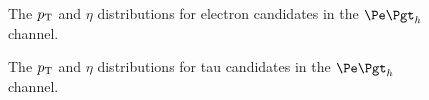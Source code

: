 \begin{figure}[htb]
\begin{center}

\end{center}
\caption{
The $p_{\mathrm{T}}$ and $\eta$ distributions for electron candidates in the $\etau$
channel.
}
\label{fig:etauelectrons}
\end{figure}


\begin{figure}[htb]
\begin{center}

\end{center}
\caption{
The $p_{\mathrm{T}}$ and $\eta$ distributions for tau candidates in the $\etau$
channel.
}
\label{fig:etautaus}
\end{figure}

